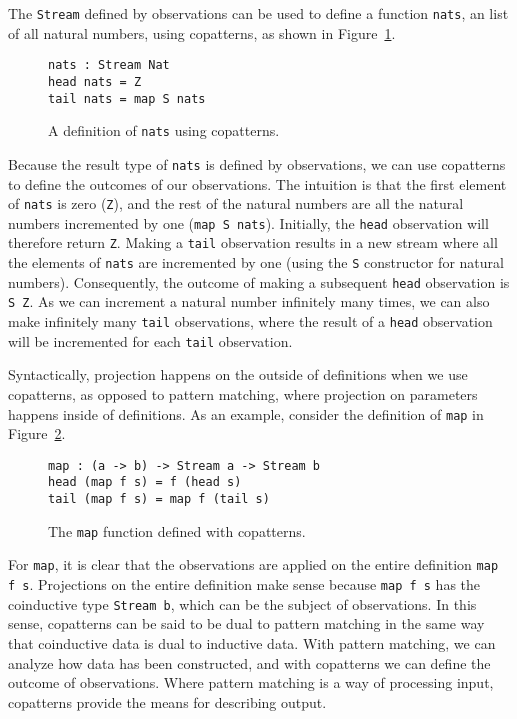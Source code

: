 The \texttt{Stream} defined by observations can be used to define a function
\texttt{nats}, an list of all natural numbers, using copatterns, as shown in
Figure~\ref{fig:nats_copatterns}.


\begin{figure}[h]
\begin{lstlisting}[mathescape]
nats : Stream Nat
head nats = Z
tail nats = map S nats
\end{lstlisting}
\caption{A definition of \texttt{nats} using copatterns.}
\label{fig:nats_copatterns}
\end{figure}

Because the result type of \texttt{nats} is defined by observations, we can use
copatterns to define the outcomes of our observations. The intuition is that the
first element of \texttt{nats} is zero (\texttt{Z}), and the rest of the natural
numbers are all the natural numbers incremented by one (\texttt{map S
  nats}). Initially, the \texttt{head} observation will therefore return
\texttt{Z}. Making a \texttt{tail} observation results in a new stream where all
the elements of \texttt{nats} are incremented by one (using the \texttt{S}
constructor for natural numbers). Consequently, the outcome of making a
subsequent \texttt{head} observation is \texttt{S Z}. As we can increment a
natural number infinitely many times, we can also make infinitely many
\texttt{tail} observations, where the result of a \texttt{head} observation will
be incremented for each \texttt{tail} observation. 


Syntactically, projection happens on the outside of definitions when we use
copatterns, as opposed to pattern matching, where projection on parameters
happens inside of definitions. As an example, consider the definition of
\texttt{map} in Figure~\ref{fig:map_copatterns}.

\begin{figure}[h]
\begin{lstlisting}[mathescape]
map : (a -> b) -> Stream a -> Stream b
head (map f s) = f (head s)
tail (map f s) = map f (tail s)
\end{lstlisting}
\caption{The \texttt{map} function defined with copatterns.}
\label{fig:map_copatterns}
\end{figure}

For \texttt{map}, it is clear that the observations are applied on the entire
definition \texttt{map f s}. Projections on the entire definition make sense
because \texttt{map f s} has the coinductive type \texttt{Stream b}, which can
be the subject of observations. In this sense, copatterns can be said to be dual
to pattern matching in the same way that coinductive data is dual to inductive
data. With pattern matching, we can analyze how data has been constructed, and
with copatterns we can define the outcome of observations. Where pattern
matching is a way of processing input, copatterns provide the means for
describing output. 

